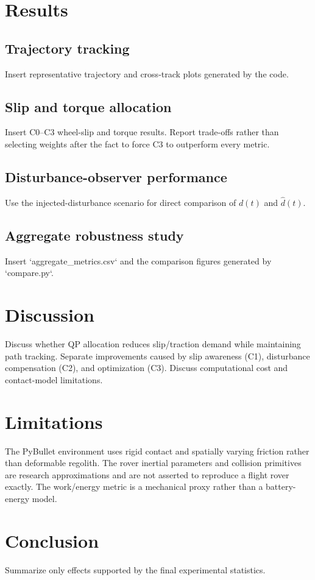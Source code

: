 \documentclass[11pt]{article}
\begin{document}
\section{Results}
\subsection{Trajectory tracking}
Insert representative trajectory and cross-track plots generated by the code.

\subsection{Slip and torque allocation}
Insert C0--C3 wheel-slip and torque results. Report trade-offs rather than selecting weights after the fact to force C3 to outperform every metric.

\subsection{Disturbance-observer performance}
Use the injected-disturbance scenario for direct comparison of $d(t)$ and $\hat d(t)$.

\subsection{Aggregate robustness study}
Insert `aggregate_metrics.csv` and the comparison figures generated by `compare.py`.

\section{Discussion}
Discuss whether QP allocation reduces slip/traction demand while maintaining path tracking. Separate improvements caused by slip awareness (C1), disturbance compensation (C2), and optimization (C3). Discuss computational cost and contact-model limitations.

\section{Limitations}
The PyBullet environment uses rigid contact and spatially varying friction rather than deformable regolith. The rover inertial parameters and collision primitives are research approximations and are not asserted to reproduce a flight rover exactly. The work/energy metric is a mechanical proxy rather than a battery-energy model.

\section{Conclusion}
Summarize only effects supported by the final experimental statistics.



\end{document}
